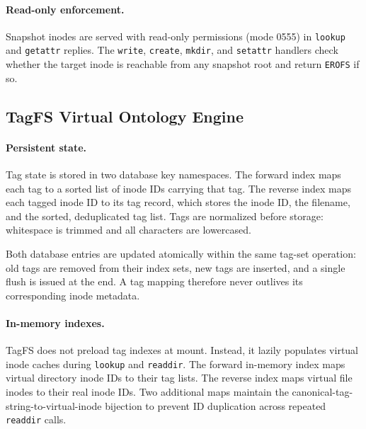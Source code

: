 \documentclass[5p,times]{elsarticle}
\begin{document}
\paragraph{Read-only enforcement.}
Snapshot inodes are served with read-only permissions (mode 0555) in
\texttt{lookup} and \texttt{getattr} replies.  The \texttt{write},
\texttt{create}, \texttt{mkdir}, and \texttt{setattr} handlers check
whether the target inode is reachable from any snapshot root and return
\texttt{EROFS} if so.

\subsection{TagFS Virtual Ontology Engine}
\label{sec:tagfs}

\paragraph{Persistent state.}
Tag state is stored in two database key namespaces.  The forward index
maps each tag to a sorted list of inode IDs carrying that tag.  The
reverse index maps each tagged inode ID to its tag record, which stores
the inode ID, the filename, and the sorted, deduplicated tag list.  Tags
are normalized before storage: whitespace is trimmed and all characters
are lowercased.

Both database entries are updated atomically within the same tag-set
operation: old tags are removed from their index sets, new tags are
inserted, and a single flush is issued at the end.  A tag mapping therefore never outlives its
corresponding inode metadata.

\paragraph{In-memory indexes.}
TagFS does not preload tag indexes at mount.  Instead, it lazily
populates virtual inode caches during \texttt{lookup} and
\texttt{readdir}. The forward in-memory index maps virtual directory
inode IDs to their tag lists.  The reverse index maps virtual file inodes
to their real inode IDs.  Two additional maps maintain the
canonical-tag-string-to-virtual-inode bijection to prevent ID duplication
across repeated \texttt{readdir} calls.
\end{document}
